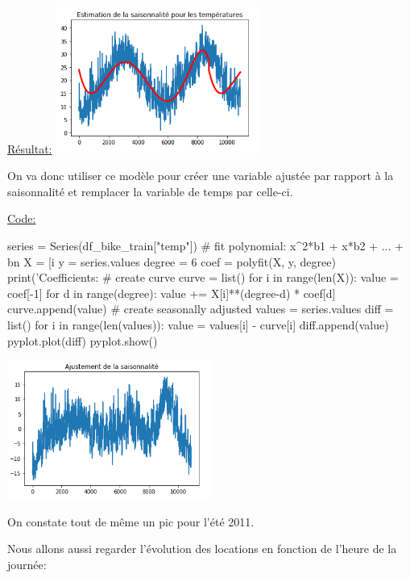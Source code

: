\documentclass[a4paper,oneside,11pt]{article}
\begin{document}
\underline{Résultat:}
\includegraphics[width=0.5\textwidth]{image_rapport/saison_timeseries}


On va donc utiliser ce modèle pour créer une variable ajustée par rapport à la saisonnalité et remplacer la variable de temps par celle-ci.

\underline{Code:}
\begin{code-Python}
series = Series(df_bike_train["temp"])
# fit polynomial: x^2*b1 + x*b2 + ... + bn
X = [i%
y = series.values
degree = 6
coef = polyfit(X, y, degree)
print('Coefficients: %
# create curve
curve = list()
for i in range(len(X)):
	value = coef[-1]
	for d in range(degree):
		value += X[i]**(degree-d) * coef[d]
	curve.append(value)
# create seasonally adjusted
values = series.values
diff = list()
for i in range(len(values)):
	value = values[i] - curve[i]
	diff.append(value)
pyplot.plot(diff)
pyplot.show()
\end{code-Python}

\includegraphics[width=0.5\textwidth]{image_rapport/ajustement_saisonnalite}

On constate tout de même un pic pour l'été 2011.



Nous allons aussi regarder l'évolution des locations en fonction de l'heure de la journée:
\end{document}
